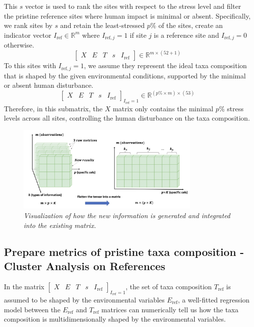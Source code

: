 This \(s\) vector is used to rank the sites with respect to 
the stress level and filter the pristine reference sites where
human impact is minimal or absent. 
Specifically, we rank sites by \(s\) and retain the least‑stressed \(p\%\) of the sites,
create an indicator vector \(I_{\text{ref}} \in \mathbb{R}^{m}\) where \(I_{\text{ref},j} = 1\) if site \(j\) is a reference site and \(I_{\text{ref},j} = 0\) otherwise.
\[
\left[
\begin{array}{ccccc}
X & E & T & s & I_{\text{ref}}
\end{array}
\right] 
\in
\mathbb{R}^{m \times (52 + 1)}
\]
To this sites with \(I_{\text{ref},j} = 1\), we assume they represent
the ideal taxa composition that is shaped by the given environmental conditions,
supported by the minimal or absent human disturbance.
\[
\left[
\begin{array}{ccccc}
X & E & T & s & I_{\text{ref}} 
\end{array}
\right]_{I_{\text{ref}} = 1}
\in
\mathbb{R}^{(p\% \times m) \times (53)}
\]
Therefore, in this submatrix, the \(X\) matrix only contains the minimal \(p\%\) stress levels across all sites,
controlling the human disturbance on the taxa composition.

\begin{figure}[!h]
\centering
\includegraphics[width=0.8\textwidth]{../presentation/figures/p4_rules_for_data_operation.png}
\caption{\textit{Visualization of how the new information is generated and integrated into the existing matrix.}}
\label{fig:p4_rules_for_data_operation}
\end{figure}

\subsection{Prepare metrics of pristine taxa composition - Cluster Analysis on References}
In the matrix
$\left[
\begin{array}{ccccc}
X & E & T & s & I_{\text{ref}} 
\end{array}
\right]_{I_{\text{ref}} = 1}
$, the set of taxa composition \(T_{\text{ref}}\) 
is assumed to be shaped by the environmental variables \(E_{\text{ref}}\),
a well-fitted regression model between the \(E_{\text{ref}}\) and \(T_{\text{ref}}\)
matrices can numerically tell us how the taxa composition is multidimensionally shaped by the environmental variables.

